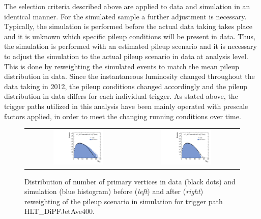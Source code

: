 The selection criteria described above are applied to data and simulation in an identical manner. For the simulated sample a further adjustment is necessary. Typically, the simulation is performed before the actual data taking takes place and it is unknown which specific pileup conditions will be present in data. Thus, the simulation is performed with an estimated pileup scenario and it is necessary to adjust the simulation to the actual pileup scenario in data at analysis level. This is done by reweighting the simulated events to match the mean pileup distribution in data. Since the instantaneous luminosity changed throughout the data taking in 2012, the pileup conditions changed accordingly and the pileup distribution in data differs for each individual trigger. As stated above, the trigger paths utilized in this analysis have been mainly operated with prescale factors applied, in order to meet the changing running conditions over time. 
\begin{figure}[!t]
  \centering
  \begin{tabular}{cc}
                \includegraphics[width=0.49\textwidth]{figures/NVtx_HltDiPFJetAve400_AfterTriggerSelection.pdf} &
                \includegraphics[width=0.49\textwidth]{figures/NVtx_HltDiPFJetAve400_AfterPUReweighting.pdf}
  \end{tabular}
  \caption{Distribution of number of primary vertices in data (black dots) and simulation (blue histogram) before (\textit{left}) and after (\textit{right}) reweighting of the pileup scenario in simulation for trigger path HLT\_DiPFJetAve400.}
  \label{fig:pu_reweight}
\end{figure}

